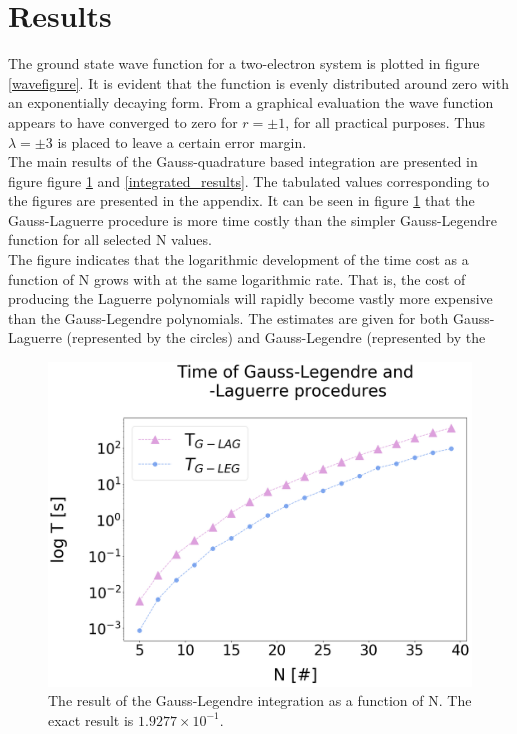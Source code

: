 \documentclass[%
reprint,
amsmath,amssymb,
aps,
]{revtex4-1}
\begin{document}
\section{Results}  \noindent
The ground state wave function for a two-electron system is plotted in figure \ref{wavefigure}. It is evident that the function is evenly distributed around zero with an exponentially decaying form. From a graphical evaluation the wave function appears to have converged to zero for $r = \pm 1$, for all practical purposes. Thus $\lambda = \pm 3$ is placed to leave a certain error margin. \\ \indent 
The main results of the Gauss-quadrature based integration are presented in figure figure \ref{integrated_time_l} and \ref{integrated_results}. The tabulated values corresponding to the figures are presented in the appendix. It can be seen in figure \ref{integrated_time_l} that the Gauss-Laguerre procedure is more time costly than the simpler Gauss-Legendre function for all selected N values.\\ \indent The figure indicates that the logarithmic development of the time cost as a function of N grows with at the same logarithmic rate. That is, the cost of producing the Laguerre polynomials will rapidly become vastly more expensive than the Gauss-Legendre polynomials. The estimates are given for both Gauss-Laguerre (represented by the circles) and  Gauss-Legendre (represented by the
\begin{figure}[!hb]
	\includegraphics[scale = 0.24]{Gauss_time.png}
	\caption{\label{integrated_time_l} The result of the Gauss-Legendre integration as a function of N. The exact result is $1.9277\times 10^{-1}$. }
\end{figure} 
\end{document}
